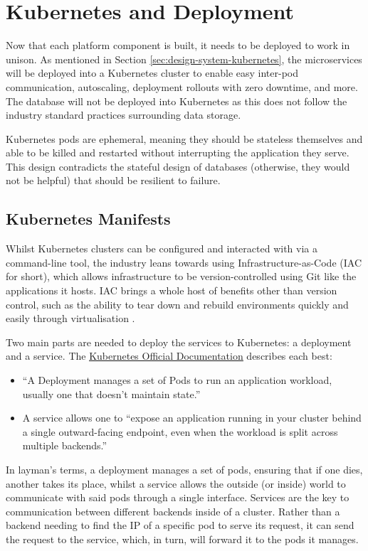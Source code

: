\section{Kubernetes and Deployment}
Now that each platform component is built, it needs to be deployed to work in unison. As mentioned in Section \ref{sec:design-system-kubernetes}, the microservices will be deployed into a Kubernetes cluster to enable easy inter-pod communication, autoscaling, deployment rollouts with zero downtime, and more.
The database will not be deployed into Kubernetes as this does not follow the industry standard practices surrounding data storage. 

Kubernetes pods are ephemeral, meaning they should be stateless themselves and able to be killed and restarted without interrupting the application they serve. 
This design contradicts the stateful design of databases (otherwise, they would not be helpful) that should be resilient to failure. 

\subsection{Kubernetes Manifests}
Whilst Kubernetes clusters can be configured and interacted with via a command-line tool, the industry leans towards using Infrastructure-as-Code (IAC for short), which allows infrastructure to be version-controlled using Git like the applications it hosts.
IAC brings a whole host of benefits other than version control, such as the ability to tear down and rebuild environments quickly and easily through virtualisation \citep{huttermann2012infrastructure}.

Two main parts are needed to deploy the services to Kubernetes: a deployment and a service. The \underline{\href{https://kubernetes.io/docs/home/}{Kubernetes Official Documentation}} \nocite{kubernetesdocs} describes each best:
\begin{itemize}
    \item ``A Deployment manages a set of Pods to run an application workload, usually one that doesn't maintain state.''
    \item A service allows one to ``expose an application running in your cluster behind a single outward-facing endpoint, even when the workload is split across multiple backends.''
\end{itemize}

In layman's terms, a deployment manages a set of pods, ensuring that if one dies, another takes its place, whilst a service allows the outside (or inside) world to communicate with said pods through a single interface.
Services are the key to communication between different backends inside of a cluster.
Rather than a backend needing to find the IP of a specific pod to serve its request, it can send the request to the service, which, in turn, will forward it to the pods it manages. 

